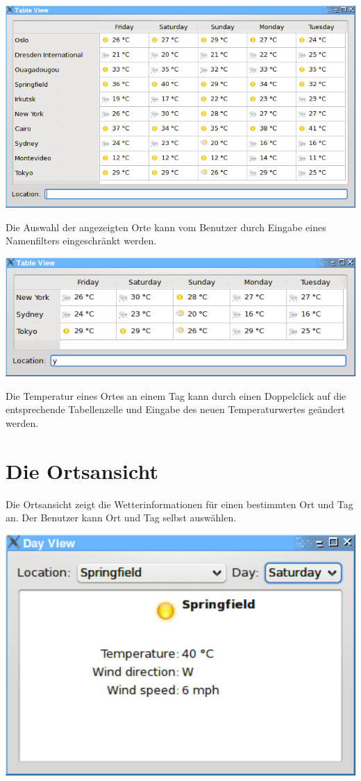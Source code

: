 \documentclass[a4paper]{scrreprt}
\begin{document}
\begin{center}
\includegraphics[width=14cm]{tableview.png}
\end{center}

Die Auswahl der angezeigten Orte kann vom Benutzer durch Eingabe eines
Namenfilters eingeschr\"ankt werden.

\begin{center}
\includegraphics[width=14cm]{tableview_filtered.png}
\end{center}

Die Temperatur eines Ortes an einem Tag kann durch einen Doppelclick auf
die entsprechende Tabellenzelle und Eingabe des neuen Temperaturwertes
ge\"andert werden.

\section{Die Ortsansicht}
Die Ortsansicht zeigt die Wetterinformationen f\"ur einen bestimmten Ort
und Tag an. Der Benutzer kann Ort und Tag selbst ausw\"ahlen.

\begin{center}
\includegraphics[width=14cm]{dayview.png}
\end{center}
\end{document}

